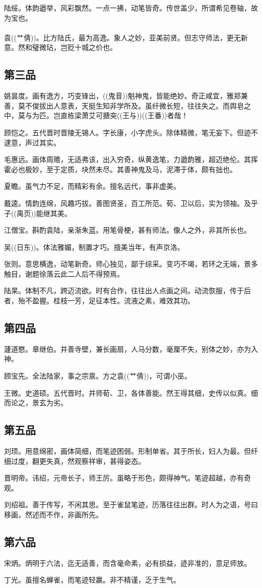 \documentclass[]{article}
\begin{document}
陆绥。体韵遒举，风彩飘然。一点一拂，动笔皆奇。传世盖少，所谓希见卷轴，故为宝也。\\
~\\
袁((艹倩))。比方陆氏，最为高逸。象人之妙，亚美前贤。但志守师法，更无新意。然和璧微玷，岂贬十城之价也。

\hypertarget{header-n24}{%
\subsection{第三品}\label{header-n24}}

姚昙度。画有逸方，巧变锋出，((鬼音))魁神鬼，皆能绝妙。奇正咸宜，雅郑兼善，莫不俊拔出人意表，天挺生知非学所及。虽纤微长短，往往失之。而舆皂之中，莫与为匹。岂直栋梁萧艾可搪突((王与))((王番))者哉！

顾恺之。五代晋时晋陵无锡人。字长康，小字虎头。除体精微，笔无妄下。但迹不逮意，声过其实。

毛惠远。画体周赡，无适弗该，出入穷奇，纵黄逸笔，力遒韵雅，超迈绝伦。其挥霍必也极妙，至于定质，块然未尽。其善神鬼及马，泥滞于体，颇有拙也。

夏瞻。虽气力不足，而精彩有余。擅名远代，事非虚美。

戴逵。情韵连绵，风趣巧拔。善图贤圣，百工所范。荀、卫以后，实为领袖。及乎子((禺页))能继其美。

江僧宝。斟酌袁陆，亲渐朱蓝。用笔骨梗，甚有师法。像人之外，非其所长也。

吴((日东))。体法雅媚，制置才巧。擅美当年，有声京洛。

张则。意思横逸，动笔新奇。师心独见，鄙于综采。变巧不竭，若环之无端，景多触目，谢题徐落云此二人后不得预焉。

陆杲。体制不凡，跨迈流欲。时有合作，往往出人点画之间。动流恢服，传于后者，殆不盈握。桂枝一芳，足征本性。流液之素，难效其功。

\hypertarget{header-n28}{%
\subsection{第四品}\label{header-n28}}

蘧道愍。章继伯。并善寺壁，兼长画扇，人马分数，毫厘不失，别体之妙，亦为入神。

顾宝先。全法陆家，事之宗禀。方之袁((艹倩))，可谓小巫。

王微。史道硕。五代晋时。并师荀、卫，各体善能。然王得其细，史传以似真。细而论之，景玄为劣。

\hypertarget{header-n32}{%
\subsection{第五品}\label{header-n32}}

刘顼。用意绵密，画体简细，而笔迹困弱。形制单省。其于所长，妇人为最。但纤细过度，翻更失真，然观察祥审，甚得姿态。

晋明帝。讳绍，元帝长子，师王厉。虽略于形色，颇得神气。笔迹超越，亦有奇观。

刘绍祖。善于传写，不闲其思。至于雀鼠笔迹，历落往往出群。时人为之语，号曰移画，然述而不作，非画所先。

\hypertarget{header-n69}{%
\subsection{第六品}\label{header-n69}}

宋炳。炳明于六法，迄无适善，而含毫命素，必有损益，迹非准的，意足师放。

丁光。虽擅名蝉雀，而笔迹轻羸。非不精谨，乏于生气。
\end{document}
